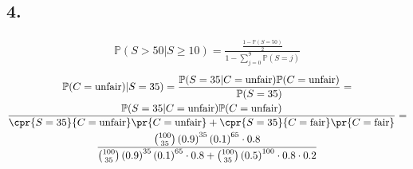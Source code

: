\subsection*{4.}
\begin{gather*}
    \mathbb{P}(S>50|S\geq 10)=\frac{\frac{1-\mathbb{P}(S=50)}{2}}{1-\sum_{j=0}^{9}\mathbb{P}(S=j)}
\end{gather*}
\begin{gather*}
        \mathbb{P}(C=\text{unfair})|S=35)=\frac{\mathbb{P}(S=35|C=\text{unfair})\mathbb{P}(C=\text{unfair})}{\mathbb{P}(S=35)}=\\ \frac{\mathbb{P}(S=35|C=\text{unfair})\mathbb{P}(C=\text{unfair})}{\cpr{S=35}{C=\text{unfair}}\pr{C=\text{unfair}}+\cpr{S=35}{C=\text{fair}}\pr{C=\text{fair}}}= \\
        \frac{\binom{100}{35}\left(0.9\right)^{35}\left(0.1\right)^{65}\cdot 0.8}{\binom{100}{35}\left(0.9\right)^{35}\left(0.1\right)^{65}\cdot 0.8+\binom{100}{35}\left(0.5\right)^{100}\cdot 0.8 \cdot 0.2}
\end{gather*}

